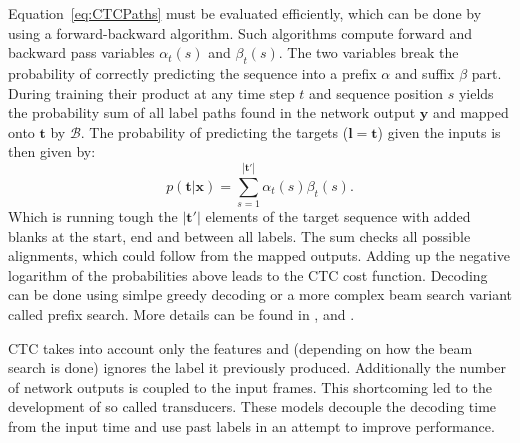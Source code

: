 Equation~\ref{eq:CTCPaths} must be evaluated efficiently, which can be done by using a forward-backward algorithm. Such algorithms compute forward and backward pass variables $\alpha_t(s)$ and $\beta_t(s)$. The two variables break the probability of correctly predicting the sequence into a prefix $\alpha$ and suffix $\beta$ part.
During training their product at any time step $t$ and sequence position $s$ yields the probability sum of all label paths found in the network output $\mathbf{y}$ and mapped onto $\mathbf{t}$ by $\mathcal{B}$.  The probability of predicting the targets ($\mathbf{l} = \mathbf{t}$) given the inputs is then given by:
\begin{equation}
p(\mathbf{t}|\mathbf{x}) = \sum\limits_{s=1}^{| \mathbf{t}' |} \alpha_t(s) \beta_t(s).
\end{equation}
Which is running tough the $| \mathbf{t}' |$ elements of the target sequence with added blanks at the start, end and between all labels. The sum checks all possible alignments, which could follow from the mapped outputs. Adding up the negative logarithm of the probabilities above leads to the CTC cost function. Decoding can be done using simlpe greedy decoding or a more complex beam search variant called prefix search. More details can be found in  \cite[chapter 7]{Graves2008}, \cite[chapter 7]{Graves2012} and \cite{Graves2006}.

CTC takes into account only the features and (depending on how the beam search is done) ignores the label it previously produced. Additionally the number of network outputs is coupled to the input frames. This shortcoming led to the development of so called transducers. These models decouple the decoding time from the input time and use past labels in an attempt to improve performance.




